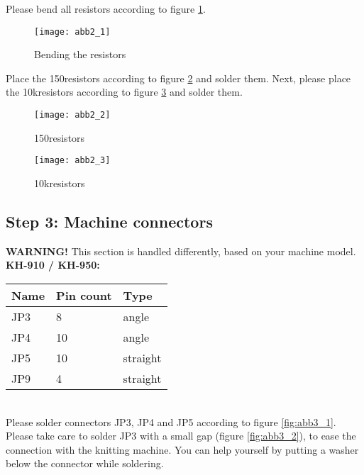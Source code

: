 \documentclass[fleqn,10pt]{SelfArx} %
\begin{document}
Please bend all resistors according to figure \ref{fig:abb2_1}.

\begin{figure}[tbhp]\centering
\texttt{[image: abb2\_1]}
\caption{Bending the resistors}
\label{fig:abb2_1}
\end{figure}

Place the 150\textOmega resistors according to figure \ref{fig:abb2_2} and solder them. Next, please place the 10k\textOmega resistors according to figure \ref{fig:abb2_3} and solder them.

\begin{figure}[tbhp]\centering
\texttt{[image: abb2\_2]}
\caption{150\textOmega resistors}
\label{fig:abb2_2}
\end{figure}

\begin{figure}[tbhp]\centering
\texttt{[image: abb2\_3]}
\caption{10k\textOmega resistors}
\label{fig:abb2_3}
\end{figure}

\FloatBarrier

 \subsection*{Step 3: Machine connectors}

\textbf{WARNING!} This section is handled differently, based on your machine model.\\

\textbf{KH-910 / KH-950:} \\

\begin{tabular}{lll}
\hline
\textbf{Name} & \textbf{Pin count}  & \textbf{Type} \\ \hline
JP3           & 8                 & angle        \\ \hline
JP4           & 10                & angle        \\ \hline
JP5           & 10                & straight     \\ \hline
JP9           & 4                 & straight     \\ \hline
\end{tabular}\\

Please solder connectors JP3, JP4 and JP5 according to figure \ref{fig:abb3_1}. Please take care to solder JP3 with a small gap (figure \ref{fig:abb3_2}), to ease the connection with the knitting machine. You can help yourself by putting a washer below the connector while soldering.
\end{document}
